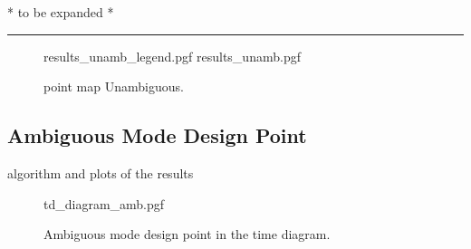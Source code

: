 \documentclass[11pt, a4paper]{scrartcl}
\begin{document}
    * to be expanded *\\
    \noindent\rule{\textwidth}{0.4pt}

    \begin{figure}[!htb]
        \centering
        {results_unamb_legend.pgf}
        {results_unamb.pgf}
        \caption{point map Unambiguous.}
        \label{fig:unambigresult}
    \end{figure}

    \subsection{Ambiguous Mode Design Point}
    \label{subsec:ambiguous_mode_design_point}
    algorithm and plots of the results
    \begin{figure}[!htb]
        \centering
        {td_diagram_amb.pgf}
        \caption{Ambiguous mode design point in the time diagram.
        }
        \label{fig:ambigmode}
    \end{figure}
\end{document}
